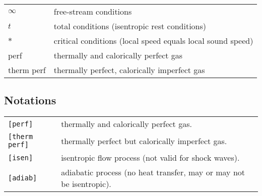 \begin{flushleft}
\renewcommand{\arraystretch}{1.3}
\begin{tabular}{ll}
$\infty$ & free-stream conditions \\
$t$ & total conditions (isentropic rest conditions) \\
$*$ & critical conditions (local speed equals local sound speed) \\
perf & thermally and calorically perfect gas \\
therm perf & thermally perfect, calorically imperfect gas \\
\end{tabular}
\end{flushleft}

\subsection*{Notations}

\begin{flushleft}
\renewcommand{\arraystretch}{1.3}
\begin{tabular}{ll}
    \texttt{[perf]} & thermally and calorically perfect gas. \\
    \texttt{[therm perf]} & thermally perfect but calorically imperfect gas.\\
    \texttt{[isen]} & isentropic flow process (not valid for shock waves).\\
    \texttt{[adiab]} & adiabatic process (no heat transfer, may or may not be isentropic).\\
\end{tabular}
\end{flushleft}
